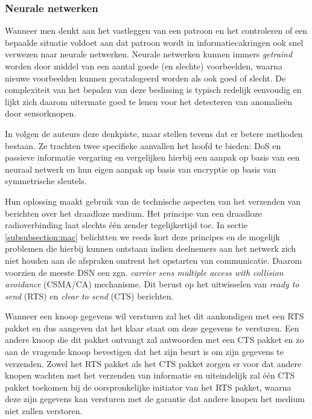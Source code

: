 \subsubsection*{Neurale netwerken}
\label{subsubsection:neuralnetworks}

Wanneer men denkt aan het vastleggen van een patroon en het controleren of een
bepaalde situatie voldoet aan dat patroon wordt in informatiecakringen ook snel
verwezen naar neurale netwerken. Neurale netwerken kunnen immers
\emph{getraind} worden door middel van een aantal goede (en slechte)
voorbeelden, waarna nieuwe voorbeelden kunnen gecatalogeerd worden als ook goed
of slecht. De complexiteit van het bepalen van deze beslissing is typisch
redelijk eenvoudig en lijkt zich daarom uitermate goed te lenen voor het
detecteren van anomalie\"en door sensorknopen.

In \cite{ramesh2012wireless} volgen de auteurs deze denkpiste, maar stellen
tevens dat er betere methoden bestaan. Ze trachten twee specifieke aanvallen
het hoofd te bieden: DoS en passieve informatie vergaring en vergelijken
hierbij een aanpak op basis van een neuraal netwerk en hun eigen aanpak op
basis van encryptie op basis van symmetrische sleutels.

Hun oplossing maakt gebruik van de technische aspecten van het verzenden van
berichten over het draadloze medium. Het principe van een draadloze
radioverbinding laat slechts \'e\'en zender tegelijkertijd toe. In sectie
\ref{subsubsection:mac} belichtten we reeds kort deze principes en de mogelijk
problemen die hierbij kunnen ontstaan indien deelnemers aan het netwerk zich
niet houden aan de afspraken omtrent het opstarten van communicatie. Daarom
voorzien de meeste DSN een zgn. \emph{carrier sens multiple access with
collision avoidance} (CSMA/CA) mechanisme. Dit berust op het uitwisselen van
\emph{ready to send} (RTS) en \emph{clear to send} (CTS) berichten.

Wanneer een knoop gegevens wil versturen zal het dit aankondigen met een RTS
pakket en dus aangeven dat het klaar staat om deze gegevens te versturen. Een
andere knoop die dit pakket ontvangt zal antwoorden met een CTS pakket en zo
aan de vragende knoop bevestigen dat het zijn beurt is om zijn gegevens te
verzenden. Zowel het RTS pakket als het CTS pakket zorgen er voor dat andere
knopen wachten met het verzenden van informatie en uiteindelijk zal \'e\'en CTS
pakket toekomen bij de oorspronkelijke initiator van het RTS pakket, waarna
deze zijn gegevens kan versturen met de garantie dat andere knopen het medium
niet zullen verstoren.

